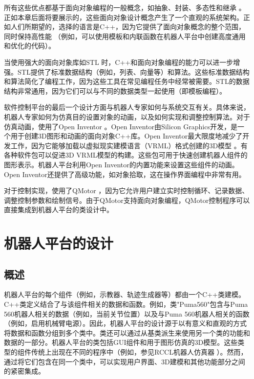 \documentclass[UTF8,a4paper,12pt]{ctexart}
\begin{document}
所有这些优点都基于面向对象编程的一般概念，如抽象、封装、多态性和继承 \cite{Stroustrup1991}。正如本章后面将要展示的，这些面向对象设计概念产生了一个直观的系统架构。正如人们所期望的，选择的语言是C++，因为它提供了面向对象概念的整个范围，同时保持高性能 \cite{Stroustrup1998}（例如，可以使用模板和内联函数在机器人平台中创建高度通用和优化的代码）。

当使用强大的面向对象库如STL \cite{Musser1996} 时，C++和面向对象编程的能力可以进一步增强。STL提供了标准数据结构（例如，列表、向量等）和算法。这些标准数据结构和算法简化了编程工作，因为这些工具在常见编程任务中经常被需要。STL的数据结构非常通用，因为它们可以与不同的数据类型一起使用（即模板编程）。

软件控制平台的最后一个设计方面与机器人专家如何与系统交互有关。具体来说，机器人专家如何为仿真目的设置对象的动画，以及如何实现和调整控制算法。对于仿真动画，使用了Open Inventor \cite{Wernecke}。Open Inventor由Silicon Graphics开发，是一个用于创建3D图形和动画的面向对象C++库。Open Inventor最大限度地减少了开发工作，因为它能够加载以虚拟现实建模语言（VRML）格式创建的3D模型 \cite{Hartman1996}。有各种软件包可以促进3D VRML模型的构建。这些包可用于快速创建机器人组件的图形表示。机器人平台利用Open Inventor的内置功能来设置这些组件的动画。Open Inventor还提供了高级功能，如对象拾取，这在操作界面编程中非常有用。

对于控制实现，使用了QMotor \cite{Loffler2002}，因为它允许用户建立实时控制循环、记录数据、调整控制参数和绘制信号。由于QMotor支持面向对象编程，QMotor控制程序可以直接集成到机器人平台的类设计中。

\section{机器人平台的设计}

\subsection{概述}

机器人平台的每个组件（例如，示教器、轨迹生成器等）都由一个C++类建模。C++类定义结合了与该组件相关的数据和函数。例如，类"Puma560"包含与Puma 560机器人相关的数据（例如，当前关节位置）以及与Puma 560机器人相关的函数（例如，启用机械臂电源）。因此，机器人平台的设计源于以有意义和直观的方式将数据和函数分组到多个类中。类还可以通过从基类派生来使用另一个类的功能和数据的一部分。机器人平台的类包括GUI组件和用于图形仿真的3D模型。这些类型的组件传统上出现在不同的程序中（例如，参见RCCL机器人仿真器 \cite{Lloyd1988}）。然而，通过将它们包含在同一个类中，可以实现用户界面、3D建模和其他功能部分之间的紧密集成。
\end{document}
